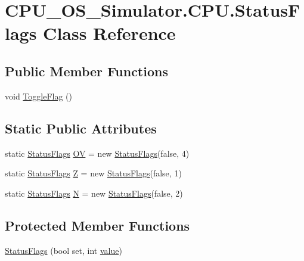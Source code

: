 \hypertarget{class_c_p_u___o_s___simulator_1_1_c_p_u_1_1_status_flags}{}\section{C\+P\+U\+\_\+\+O\+S\+\_\+\+Simulator.\+C\+P\+U.\+Status\+Flags Class Reference}
\label{class_c_p_u___o_s___simulator_1_1_c_p_u_1_1_status_flags}
\subsection*{Public Member Functions}
\begin{DoxyCompactItemize}
\item 
void \hyperlink{class_c_p_u___o_s___simulator_1_1_c_p_u_1_1_status_flags_aca93016e4ad4e70951b071ba2ae575c1}{Toggle\+Flag} ()
\end{DoxyCompactItemize}
\subsection*{Static Public Attributes}
\begin{DoxyCompactItemize}
\item 
static \hyperlink{class_c_p_u___o_s___simulator_1_1_c_p_u_1_1_status_flags}{Status\+Flags} \hyperlink{class_c_p_u___o_s___simulator_1_1_c_p_u_1_1_status_flags_ad4725b32f8d1718df7e6a1b6b4a21170}{O\+V} = new \hyperlink{class_c_p_u___o_s___simulator_1_1_c_p_u_1_1_status_flags}{Status\+Flags}(false, 4)
\item 
static \hyperlink{class_c_p_u___o_s___simulator_1_1_c_p_u_1_1_status_flags}{Status\+Flags} \hyperlink{class_c_p_u___o_s___simulator_1_1_c_p_u_1_1_status_flags_aa38943c12054a3f613161ecde5580f27}{Z} = new \hyperlink{class_c_p_u___o_s___simulator_1_1_c_p_u_1_1_status_flags}{Status\+Flags}(false, 1)
\item 
static \hyperlink{class_c_p_u___o_s___simulator_1_1_c_p_u_1_1_status_flags}{Status\+Flags} \hyperlink{class_c_p_u___o_s___simulator_1_1_c_p_u_1_1_status_flags_a48a766c8a99690112570b884b09e9b10}{N} = new \hyperlink{class_c_p_u___o_s___simulator_1_1_c_p_u_1_1_status_flags}{Status\+Flags}(false, 2)
\end{DoxyCompactItemize}
\subsection*{Protected Member Functions}
\begin{DoxyCompactItemize}
\item 
\hyperlink{class_c_p_u___o_s___simulator_1_1_c_p_u_1_1_status_flags_ab99e9cd2522d43a7dfd3224ff9ae0d79}{Status\+Flags} (bool set, int \hyperlink{class_c_p_u___o_s___simulator_1_1_c_p_u_1_1_status_flags_a289edb09fa9bef509188db5619be8dee}{value})
\end{DoxyCompactItemize}
